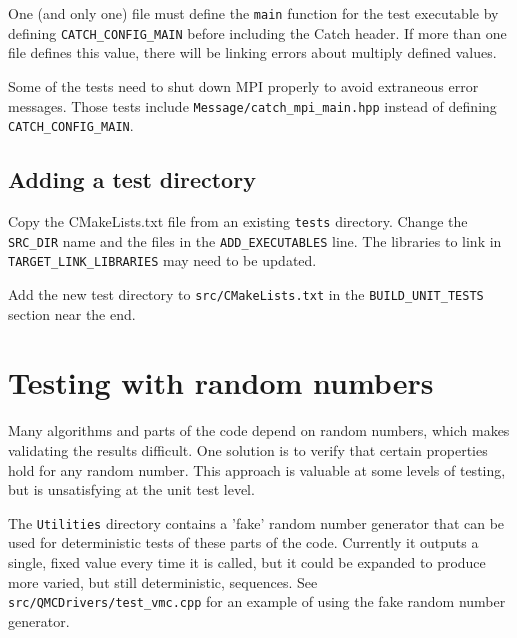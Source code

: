 One (and only one) file must define the \texttt{main} function for the test executable by defining \texttt{CATCH\_CONFIG\_MAIN} before including the Catch header.  If more than one file defines this value, there will be linking errors about multiply defined values.

Some of the tests need to shut down MPI properly to avoid extraneous error messages. Those tests include \texttt{Message/catch\_mpi\_main.hpp} instead of defining \texttt{CATCH\_CONFIG\_MAIN}.


\subsection{Adding a test directory}
Copy the CMakeLists.txt file from an existing \texttt{tests} directory.
Change the \texttt{SRC\_DIR} name and the  files in the \texttt{ADD\_EXECUTABLES} line.  The libraries to link in \texttt{TARGET\_LINK\_LIBRARIES} may need to be updated.

Add the new test directory to \texttt{src/CMakeLists.txt} in the \texttt{BUILD\_UNIT\_TESTS} section near the end.


\section{Testing with random numbers}
Many algorithms and parts of the code depend on random numbers, which makes validating the results difficult.
One solution is to verify that certain properties hold for any random number.
This approach is valuable at some levels of testing, but is unsatisfying at the unit test level.

The \texttt{Utilities} directory contains a 'fake' random number generator that can be used for deterministic tests of these parts of the code.
Currently it outputs a single, fixed value every time it is called, but it could be expanded to produce more varied, but still deterministic, sequences.
See \texttt{src/QMCDrivers/test\_vmc.cpp} for an example of using the fake random number generator.
